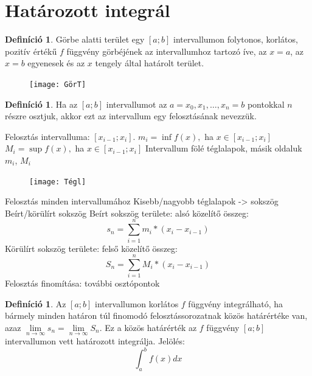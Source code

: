 \documentclass[twoside,12pt]{report}
\theoremstyle{definition}
\newtheorem{definition}[theorem]{Definíció}
\begin{document}
\section{Határozott integrál}
	\begin{definition}
		Görbe alatti terület egy $[a;b]$ intervallumon folytonos, korlátos, pozitív értékű $f$ függvény görbéjének az intervallumhoz tartozó íve, az $x=a$, az $x=b$ egyenesek és az $x$ tengely által határolt terület.
	\end{definition}
	\begin{figure}[H]
		\centering
		\texttt{[image: GörT]}
	\end{figure}
	\begin{definition}
		Ha az $[a;b]$ intervallumot az $a=x_0,x_1,\dots,x_n=b$ pontokkal $n$ részre osztjuk, akkor ezt az intervallum egy felosztásának nevezzük.
	\end{definition}
	\begin{outline}
		\1 Felosztás intervalluma: $[x_{i-1};x_i]$. 
			\2 $m_i=\inf f(x),$ ha $x\in[x_{i-1};x_i]$
			\2 $M_i=\sup f(x),$ ha $x\in[x_{i-1};x_i]$
			\2 Intervallum fölé téglalapok, másik oldaluk $m_i$, $M_i$
			\begin{figure}[H]
				\centering
				\texttt{[image: Tégl]}
			\end{figure}
			\2 Felosztás minden intervallumához
			\2 Kisebb/nagyobb téglalapok -> sokszög
			\2 Beírt/körülírt sokszög
			\2 Beírt sokszög területe: alsó közelítő összeg:
			\begin{equation*}
				s_n=\sum_{i=1}^{n} m_i*(x_i-x_{i-1})
			\end{equation*}
			\2 Körülírt sokszög területe: felső közelítő összeg:
			\begin{equation*}
				S_n=\sum_{i=1}^n M_i*(x_i-x_{i-1})
			\end{equation*}
			\2 Felosztás finomítása: további osztópontok
	\end{outline}
	\begin{definition}
		Az $[a;b]$ intervallumon korlátos $f$ függvény integrálható, ha bármely minden határon túl finomodó felosztássorozatnak közös határértéke van, azaz $\lim\limits_{n\to\infty} s_n=\lim\limits_{n\to\infty}S_n$. Ez a közös határérték az $f$ függvény $[a;b]$ intervallumon vett határozott integrálja. Jelölés:
		\begin{equation*}
			\int_{a}^{b}f(x)dx
		\end{equation*}
	\end{definition}
\end{document}

